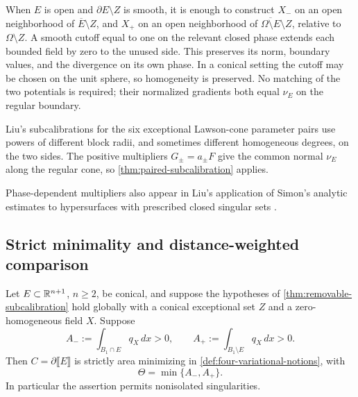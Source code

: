 \begin{remark}
\label{rem:phase-local-fields}
When \(E\) is open and \(\partial E\setminus Z\) is smooth, it is
enough to construct \(X_-\) on an open neighborhood of
\(\overline E\setminus Z\), and \(X_+\) on an open neighborhood of
\(\overline{\Omega\setminus E}\setminus Z\), relative to
\(\Omega\setminus Z\).  A smooth cutoff equal to one on the relevant
closed phase extends each bounded field by zero to the unused side.
This preserves its norm, boundary values, and the divergence on its
own phase.  In a conical setting the cutoff may be chosen on the unit
sphere, so homogeneity is preserved.  No matching of the two potentials
is required; their normalized gradients both equal \(\nu_E\) on the
regular boundary.

Liu's subcalibrations for the six exceptional Lawson-cone parameter pairs
\cite[Sections~2.1 and~3]{Liu19} use powers of different block radii,
and sometimes different homogeneous degrees, on the two sides.
The positive multipliers \(G_\pm=a_\pm F\) give the common normal
\(\nu_E\) along the regular cone, so
\cref{thm:paired-subcalibration} applies.

Phase-dependent multipliers also appear in Liu's application of
Simon's analytic estimates to hypersurfaces with prescribed closed
singular sets \cite[Theorem~1 and Definition~1.3]{LiuSimon26}.
\end{remark}

\subsection*{Strict minimality and distance-weighted comparison}

\begin{theorem}
\label{thm:strict-minimality-flux}
Let \(E\subset\mathbb R^{n+1}\), \(n\geq2\), be conical, and suppose the hypotheses
of \cref{thm:removable-subcalibration} hold globally with a conical
exceptional set \(Z\) and a zero-homogeneous field \(X\).
Suppose
\begin{equation}\label{eq:two-phase-flux}
 A_-:=\int_{B_1\cap E}q_X\,dx>0,
 \qquad
 A_+:=\int_{B_1\setminus E}q_X\,dx>0.
\end{equation}
Then \(C=\partial\llbracket E\rrbracket\) is strictly area minimizing in
\cref{def:four-variational-notions}, with
\begin{equation}\label{eq:strict-minimality-constant}
 \Theta=\min\{A_-,A_+\}.
\end{equation}
In particular the assertion permits nonisolated singularities.
\end{theorem}


